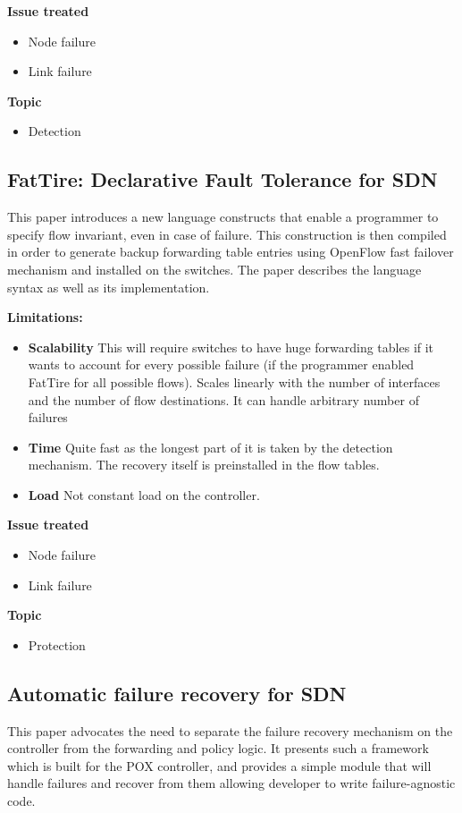 \documentclass[compsoc]{IEEEtran}
\begin{document}
\textbf{Issue treated}
\begin{itemize}
	\item Node failure
	\item Link failure
\end{itemize}

\textbf{Topic}
\begin{itemize}
	\item Detection
\end{itemize}

\subsection{FatTire: Declarative Fault Tolerance for SDN \cite{Reitblatt:2013:FDF:2491185.2491187}}
This paper introduces a new language constructs that enable a programmer to specify flow invariant, even in case of failure. This construction is then compiled in order to generate backup forwarding table entries using OpenFlow fast failover mechanism and installed on the switches.
The paper describes the language syntax as well as its implementation.

\textbf{Limitations:}
\begin{itemize}
	\item \textbf{Scalability} This will require switches to have huge forwarding tables if it wants to account for every possible failure (if the programmer enabled FatTire for all possible flows). Scales linearly with the number of interfaces and the number of flow destinations. It can handle arbitrary number of failures
	\item \textbf{Time} Quite fast as the longest part of it is taken by the detection mechanism. The recovery itself is preinstalled in the flow tables.
	\item \textbf{Load} Not constant load on the controller.
\end{itemize}

\textbf{Issue treated}
\begin{itemize}
	\item Node failure
	\item Link failure
\end{itemize}

\textbf{Topic}
\begin{itemize}
	\item Protection
\end{itemize}

\subsection{Automatic failure recovery for SDN \cite{Kuzniar:2013:AFR:2491185.2491218}}
This paper advocates the need to separate the failure recovery mechanism on the controller from the forwarding and policy logic. It presents such a framework which is built for the POX controller, and provides a simple module that will handle failures and recover from them allowing developer to write failure-agnostic code.
\end{document}
